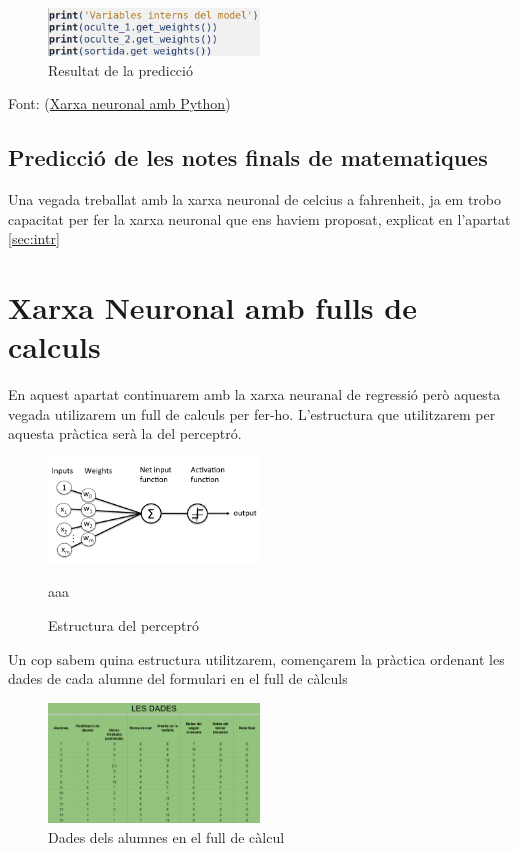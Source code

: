 \begin{figure}[H]
    \centering
    \includegraphics[width=0.5\textwidth]{./figures/9.png}
    \caption{Resultat de la predicció}
\end{figure}

Font: (\href{https://www.youtube.com/watch?v=iX_on3VxZzkhttps://www.youtube.com/watch?v=iX_on3VxZzk}{Xarxa neuronal amb Python})

\subsection{Predicció de les notes finals de matematiques }
Una vegada treballat amb la xarxa neuronal de celcius a fahrenheit, ja em trobo capacitat per fer la xarxa neuronal que ens haviem proposat, explicat en l'apartat \ref{sec:intr}




\section{Xarxa Neuronal amb fulls de calculs}\label{sec:11}
En aquest apartat continuarem amb la xarxa neuranal de regressió però aquesta vegada utilizarem un full de calculs per fer-ho.
L'estructura que utilitzarem per aquesta pràctica serà la del perceptró.

\begin{figure}[H]
    \centering
    \includegraphics[width=0.5\textwidth]{./figures/perceptro.png}
    \caption{Estructura del perceptró}aaa
\end{figure}

Un cop sabem quina estructura utilitzarem, començarem la pràctica ordenant les dades de cada alumne del formulari en el full de càlculs

\begin{figure}[H]
    \centering
    \includegraphics[width=0.5\textwidth]{./figures/Dades.png}
    \caption{Dades dels alumnes en el full de càlcul}
\end{figure}

